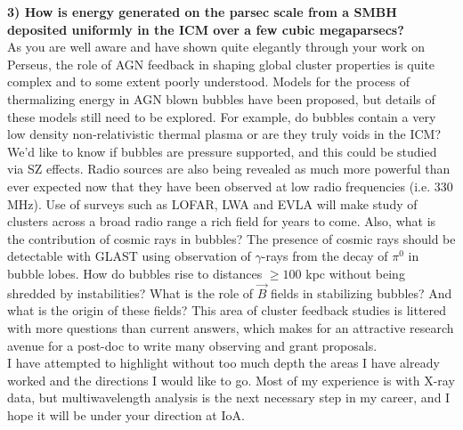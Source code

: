 \documentclass[11pt]{article}
\begin{document}
{\bf 3) How is energy generated on the parsec scale from a SMBH
deposited uniformly in the ICM over a few cubic megaparsecs?}\\
As you are well aware and have shown quite elegantly through your work
on Perseus, the role of AGN feedback in shaping global cluster
properties is quite complex and to some extent poorly
understood. Models for the process of thermalizing energy in AGN blown
bubbles have been proposed, but details of these models still need to be explored.
For example, do bubbles contain a very low density non-relativistic
thermal plasma or are they truly voids in the ICM? We'd like to know
if bubbles are pressure supported, and this could be studied via SZ
effects. Radio sources are also being revealed as much more powerful
than ever expected now that they have been observed at low radio
frequencies (i.e. 330 MHz). Use of surveys such as LOFAR, LWA and
EVLA will make study of clusters across a broad radio range a rich
field for years to come. Also, what is the contribution of cosmic rays in
bubbles? The presence of cosmic rays should be detectable with GLAST
using observation of $\gamma$-rays from the decay of $\pi^0$ in bubble
lobes. How do bubbles rise to distances $\geq 100$ kpc without being
shredded by instabilities? What is the role of $\vec{B}$ fields in
stabilizing bubbles? And what is the origin of these fields? This area
of cluster feedback studies is littered with more questions than
current answers, which makes for an attractive research avenue for a
post-doc to write many observing and grant proposals.\\

I have attempted to highlight without too much depth the areas I have
already worked and the directions I would like to go. Most of my
experience is with X-ray data, but multiwavelength analysis is the
next necessary step in my career, and I hope it will be under your
direction at IoA.
\end{document}

